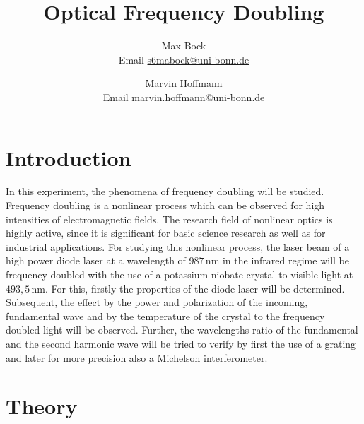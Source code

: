 \documentclass[10pt, a4paper, notitlepage, DIV=15]{scrartcl}
\title{Optical Frequency Doubling}
\author{Max Bock \\ Email \href{mailto:s6mabock@uni-bonn.de}{s6mabock@uni-bonn.de} 
	\and Marvin Hoffmann \\ Email \href{mailto:marvin.hoffmann@uni-bonn.de}{marvin.hoffmann@uni-bonn.de} }
\begin{document}
\maketitle
\tableofcontents
\newpage
\section{Introduction}
In this experiment, the phenomena of frequency doubling will be studied. Frequency doubling is a nonlinear process which can be observed for high intensities of electromagnetic fields. The research field of nonlinear optics is highly active, since it is significant for basic science research as well as for industrial applications. For studying this nonlinear process, the laser beam of a high power diode laser at a wavelength of $987\,$nm in the infrared regime will be frequency doubled with the use of a potassium niobate crystal to visible light at $493,5\,$nm. For this, firstly the properties of the diode laser will be determined. Subsequent, the effect by the power and polarization of the incoming, fundamental wave and by the temperature of the crystal to the frequency doubled light will be observed. Further, the wavelengths ratio of the fundamental and the second harmonic wave will be tried to verify by first the use of a grating and later for more precision also a Michelson interferometer. 
\section{Theory}
\end{document}
